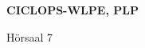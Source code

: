\documentclass[a4paper]{article}
\begin{document}
\printGenericVSLHeader
\begin{center}
\begin{vsltext}{3cm}{4cm}

   \vspace{0.5cm} 

    \textbf{CICLOPS-WLPE, PLP} 

    \vspace{1.5cm}

    Hörsaal 7

\end{vsltext}

\end{center}
\end{document}
